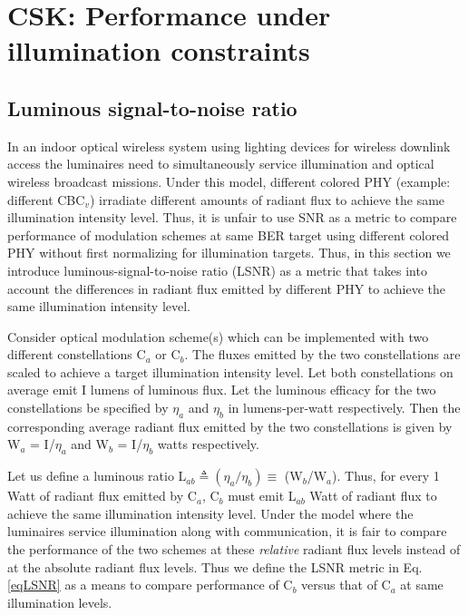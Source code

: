 \documentclass[10pt,letterpaper]{article}
\begin{document}
\section{CSK: Performance under illumination constraints}\label{sCSKLSNR}

\subsection{Luminous signal-to-noise ratio}\label{ssLSNR}

In an indoor optical wireless system using lighting devices for wireless downlink access the luminaires need to simultaneously service illumination and optical wireless broadcast missions. Under this model, different colored PHY (example: different CBC$_{v}$) irradiate different amounts of radiant flux to achieve the same illumination intensity level. Thus, it is unfair to use SNR as a metric to compare performance of modulation schemes at same BER target using different colored PHY without first normalizing for illumination targets. Thus, in this section we introduce luminous-signal-to-noise ratio (LSNR) as a metric that takes into account the differences in radiant flux emitted by different PHY to achieve the same illumination intensity level.

Consider optical modulation scheme(s) which can be implemented with two different constellations C$_a$ or C$_b$. The fluxes emitted by the two constellations are scaled to achieve a target illumination intensity level. Let both constellations on average emit I lumens of luminous flux. Let the luminous efficacy for the two constellations be specified by $\eta_a$ and $\eta_b$ in lumens-per-watt respectively. Then the corresponding average radiant flux emitted by the two constellations is given by W$_a$ = I/$\eta_a$ and W$_b$  = I/$\eta_b$ watts respectively. 

Let us define a luminous ratio L$_{ab}\triangleq (\eta_a/\eta_b) \equiv$ (W$_b$/W$_a$). Thus, for every 1 Watt of radiant flux emitted by C$_a$, C$_b$ must emit L$_{ab}$ Watt of radiant flux to achieve the same illumination intensity level. Under the model where the luminaires service illumination along with communication, it is fair to compare the performance of the two schemes at these \textit{relative} radiant flux levels instead of at the absolute radiant flux levels. Thus we define the LSNR metric in Eq.\eqref{eqLSNR} as a means to compare performance of C$_b$ versus that of C$_a$ at same illumination levels. 
\end{document}

